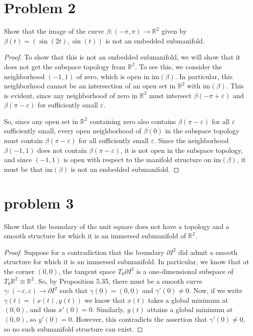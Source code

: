 \documentclass[fontsize=11pt]{scrartcl} %
\numberwithin{equation}{section} %
\numberwithin{figure}{section} %
\numberwithin{table}{section} %
\newcommand{\R}{\mathbb{R}}
\newcommand{\im}{\textrm{im}}
\begin{document}
\section*{Problem 2} %
Show that the image of the curve $\beta:(-\pi,\pi)\to\R^2$ given by
$\beta(t) = (\sin(2t),\sin(t))$ is not an embedded submanifold.
\\
\begin{proof}
To show that this is not an embedded submanifold, we will show that it does not
    get the subspace topology from $\R^2$. To see this, we consider the
    neighborhood $(-1,1)$ of zero, which is open in $\im(\beta)$. In particular,
    this neighborhood cannot be an intersection of an open set in $\R^2$ with
    $\im(\beta)$. This is evident, since any neighborhood of zero in $\R^2$ must
    intersect $\beta(-\pi+\varepsilon)$ and $\beta(\pi-\varepsilon)$ for
    sufficiently small $\varepsilon$.

    So, since any open set in $\R^2$ containing zero also contains
    $\beta(\pi-\varepsilon)$ for all $\varepsilon$ sufficiently small, every
    open neighborhood of $\beta(0)$ in the subspace topology must contain
    $\beta(\pi-\varepsilon)$ for all sufficiently small $\varepsilon$. Since the
    neighborhood $\beta(-1,1)$ does not contain $\beta(\pi-\varepsilon)$, it is
    not open in the subspace topology, and since $(-1,1)$ is open with respect
    to the manifold structure on $\im(\beta)$, it must be that $\im(\beta)$ is
    not an embedded submanifold.
\end{proof}

\newpage

\section*{problem 3} %
Show that the boundary of the unit square does not have a topology and a smooth
structure for which it is an immersed submanifold of $\R^2$.
\\
\begin{proof}
Suppose for a contradiction that the boundary $\partial I^2$ did admit a smooth
structure for which it is an immersed submanifold. In particular, we know that
    at the corner $(0,0)$, the tangent space $T_0\partial I^2$ is a
    one-dimensional subspace of $T_0\R^2\cong\R^2$. So, by Proposition 5.35,
    there must be a smooth curve $\gamma:(-\varepsilon,\varepsilon)\to\partial
    I^2$ such that $\gamma(0) = (0,0)$ and $\gamma'(0)\neq 0$. Now, if we write
    $\gamma(t) = (x(t),y(t))$ we know that $x(t)$ takes a global minimum at
    $(0,0)$, and thus $x'(0)=0$. Similarly, $y(t)$ attains a global minimum at
    $(0,0)$, so $y'(0)=0$. However, this contradicts the assertion that
    $\gamma'(0)\neq 0$, so no such submanifold structure can exist.
\end{proof}
\end{document}
